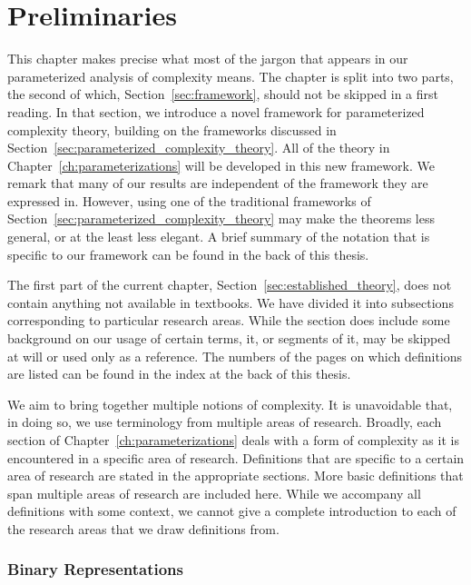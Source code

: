 \chapter{Preliminaries}

This chapter makes precise what most of the jargon that appears in our parameterized analysis of complexity means.
The chapter is split into two parts, the second of which, Section~\ref{sec:framework}, should not be skipped in a first reading.
In that section, we introduce a novel framework for parameterized complexity theory, building on the frameworks discussed in Section~\ref{sec:parameterized_complexity_theory}.
All of the theory in Chapter~\ref{ch:parameterizations} will be developed in this new framework.
We remark that many of our results are independent of the framework they are expressed in.
However, using one of the traditional frameworks of Section~\ref{sec:parameterized_complexity_theory} may make the theorems less general, or at the least less elegant.
A brief summary of the notation that is specific to our framework can be found in the back of this thesis.

The first part of the current chapter, Section~\ref{sec:established_theory}, does not contain anything not available in textbooks.
We have divided it into subsections corresponding to particular research areas.
While the section does include some background on our usage of certain terms, it, or segments of it, may be skipped at will or used only as a reference.
The numbers of the pages on which definitions are listed can be found in the index at the back of this thesis.


\label{sec:established_theory}%

We aim to bring together multiple notions of complexity.
It is unavoidable that, in doing so, we use terminology from multiple areas of research.
Broadly, each section of Chapter~\ref{ch:parameterizations} deals with a form of complexity as it is encountered in a specific area of research.
Definitions that are specific to a certain area of research are stated in the appropriate sections.
More basic definitions that span multiple areas of research are included here.
While we accompany all definitions with some context, we cannot give a complete introduction to each of the research areas that we draw definitions from.


\subsection{Binary Representations}
\label{sec:preliminaries:binary}%

